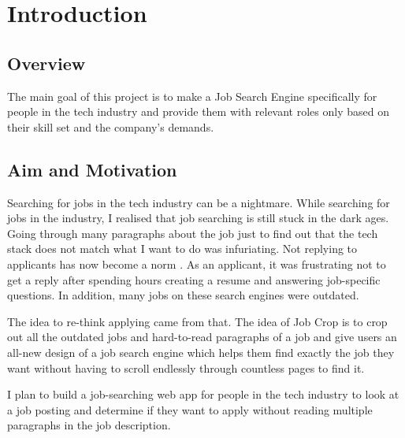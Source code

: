 
\chapter{Introduction} %

\label{Chapter1} %


\newcommand{\keyword}[1]{\textbf{#1}}
\newcommand{\tabhead}[1]{\textbf{#1}}
\newcommand{\code}[1]{\texttt{#1}}
\newcommand{\file}[1]{\texttt{\bfseries#1}}
\newcommand{\option}[1]{\texttt{\itshape#1}}


\section{Overview}
The main goal of this project is to make a Job Search Engine specifically for people in the tech industry and provide them with relevant roles only based on their skill set and the company's demands.

\section{Aim and Motivation}
Searching for jobs in the tech industry can be a nightmare. While searching for jobs in the industry, I realised that job searching is still stuck in the dark ages. Going through many paragraphs about the job just to find out that the tech stack does not match what I want to do was infuriating. Not replying to applicants has now become a norm \parencite{Reference6}. As an applicant, it was frustrating not to get a reply after spending hours creating a resume and answering job-specific questions. In addition, many jobs on these search engines were outdated.

The idea to re-think applying came from that. The idea of Job Crop is to crop out all the outdated jobs and hard-to-read paragraphs of a job and give users an all-new design of a job search engine which helps them find exactly the job they want without having to scroll endlessly through countless pages to find it. 

I plan to build a job-searching web app for people in the tech industry to look at a job posting and determine if they want to apply without reading multiple paragraphs in the job description. 

